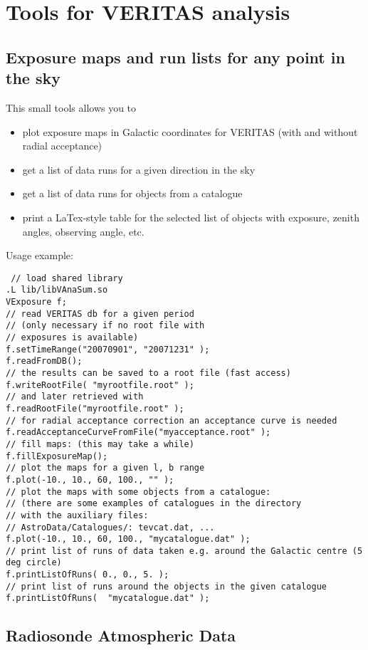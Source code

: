 \documentclass[titlepage,a4paper,twoside,11pt]{report}
\begin{document}
\chapter{Tools for VERITAS analysis}

\section{Exposure maps and run lists for any point in the sky}

This small tools allows you to 

\begin{itemize}
\item plot exposure maps in Galactic coordinates for VERITAS (with and without radial acceptance)
\item get a list of data runs for a given direction in the sky
\item get a list of data runs for objects from a catalogue
\item print a LaTex-style table for the selected list of objects with exposure, zenith angles, observing angle, etc.
\end{itemize}

Usage example:

\begin{lstlisting}
 // load shared library
.L lib/libVAnaSum.so
VExposure f;
// read VERITAS db for a given period
// (only necessary if no root file with
// exposures is available)
f.setTimeRange("20070901", "20071231" );
f.readFromDB();
// the results can be saved to a root file (fast access)
f.writeRootFile( "myrootfile.root" );
// and later retrieved with
f.readRootFile("myrootfile.root" );
// for radial acceptance correction an acceptance curve is needed
f.readAcceptanceCurveFromFile("myacceptance.root" );
// fill maps: (this may take a while)
f.fillExposureMap();
// plot the maps for a given l, b range
f.plot(-10., 10., 60, 100., "" );
// plot the maps with some objects from a catalogue:
// (there are some examples of catalogues in the directory
// with the auxiliary files:
// AstroData/Catalogues/: tevcat.dat, ... 
f.plot(-10., 10., 60, 100., "mycatalogue.dat" );
// print list of runs of data taken e.g. around the Galactic centre (5 deg circle)
f.printListOfRuns( 0., 0., 5. ); 
// print list of runs around the objects in the given catalogue
f.printListOfRuns(  "mycatalogue.dat" );
\end{lstlisting}

\section{Radiosonde Atmospheric Data}
\end{document}
